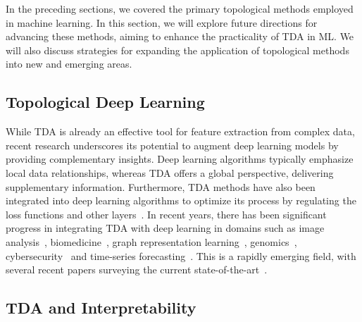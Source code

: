 In the preceding sections, we covered the primary topological methods employed in machine learning. In this section, we will explore future directions for advancing these methods, aiming to enhance the practicality of TDA in ML. We will also discuss strategies for expanding the application of topological methods into new and emerging areas.
 

\subsection{Topological Deep Learning}

While TDA is already an effective tool for feature extraction from complex data, recent research underscores its potential to augment deep learning models by providing complementary insights. Deep learning algorithms typically emphasize local data relationships, whereas TDA offers a global perspective, delivering supplementary information. 
Furthermore, TDA methods have also been integrated into deep learning algorithms to optimize its process by regulating the loss functions and other layers~\cite{hu2019topology,wang2020topogan}. 
In recent years, there has been significant progress in integrating TDA with deep learning in domains such as image analysis~\cite{singh2023topological,clough2020topological,peng2024phg}, biomedicine~\cite{luo2024improving}, graph representation learning~\cite{immonen2024going,chen2021topological}, genomics~\cite{amezquita2023genomics}, cybersecurity~\cite{guo2022gld} and time-series forecasting~\cite{coskunuzer2024time,shamsi2024graphpulse}. This is a rapidly emerging field, with several recent papers surveying the current state-of-the-art~\cite{papamarkou2024position,zia2024topological,hajij2022topological,papillon2023architectures}.

 \subsection{TDA and Interpretability}

